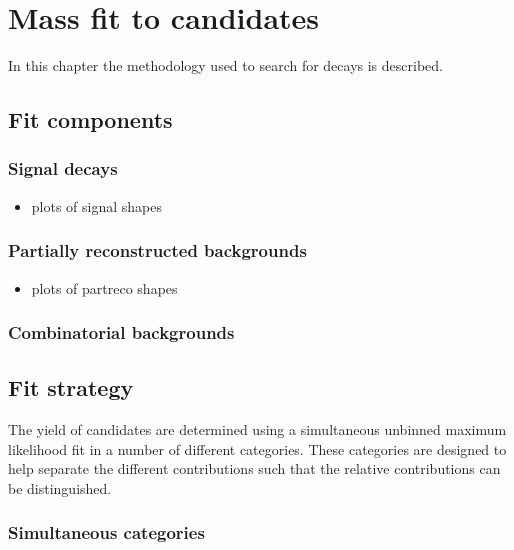 \chapter{Mass fit to \decay{\Bp}{\Dsp\phiz} candidates} 
\label{ch:B2DsPhi}

\minitoc

In this chapter the methodology used to search for \decay{\Bp}{\Dsp\phiz} decays is described.

\section{Fit components}
\label{sec:B2DsPhi_fitcomponents}


\subsection{Signal decays}
\label{sec:B2DsPhi_signalcomps}

{\color{Red}
\begin{itemize}
\item plots of signal shapes
\end{itemize}
}


\subsection{Partially reconstructed backgrounds}
\label{sec:B2DsPhi_partrecocomps}


{\color{Red}
\begin{itemize}
\item plots of partreco shapes
\end{itemize}
}

\subsection{Combinatorial  backgrounds}
\label{sec:B2DsPhi_combcomps}

\section{Fit strategy}
\label{sec:B2DsPhi_fitstrategy}

The yield of \decay{\Bp}{\Dsp\phiz} candidates are determined using a simultaneous unbinned maximum likelihood fit in a number of different categories.
These categories are designed to help separate the different contributions such that the relative contributions can be distinguished.


\subsection{Simultaneous categories}
\label{sec:B2DsPhi_fitstrategy}


